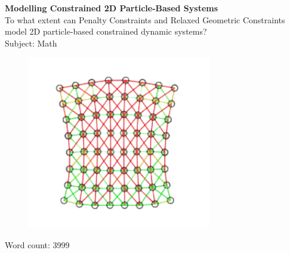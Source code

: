 \documentclass[12pt, letterpaper]{article}
\begin{document}
\begin{titlepage}
    \begin{center}
       \vspace*{1cm}
       \huge
       \textbf{Modelling Constrained 2D Particle-Based Systems}\\
       \large
       \vspace{0.5cm}
        To what extent can Penalty Constraints and Relaxed Geometric Constraints model 2D particle-based constrained dynamic systems?
       \vspace{1.5cm}\\
        Subject: Math
       \vfill
        \begin{figure}[H]
        \centering
        \includegraphics[width=8cm]{title clear.png}

        \end{figure} 
        \vfill
            
       \vspace{0.8cm}
     
            
       Word count: 3999\\
            
    \end{center}
\end{titlepage}


\tableofcontents
\clearpage
\doublespacing
\end{document}
